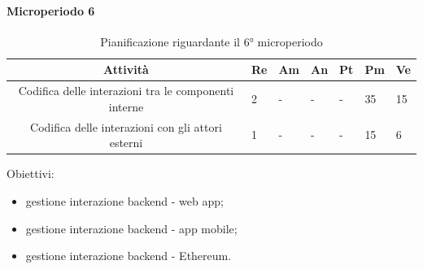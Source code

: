 \paragraph{Microperiodo 6}
\begin{table}[H]
	\centering
	\renewcommand{\arraystretch}{1.5}
	\begin{tabular}{|c|p{10mm}|p{8mm}|p{8mm}|p{8mm}|p{8mm}|p{8mm}|}
		\hline
		\rowcolor{lighter-grayer}
		\textbf{Attività}                         & \textbf{Re} & \textbf{Am} & \textbf{An} & \textbf{Pt} & \textbf{Pm} & \textbf{Ve} \\ \hline
		
		Codifica delle interazioni tra le componenti interne & 2                                &       -                           &        -                          &             -                     & 35                               & 15                               \\ \hline
		Codifica delle interazioni con gli attori esterni    & 1                                &      -                            &         -                         &                -                  & 15                               & 6                                \\ \hline
		
	\end{tabular}
	\caption{ Pianificazione riguardante il 6° microperiodo\\}
\end{table}

Obiettivi:
\begin{itemize}
	\item gestione interazione backend - web app;
	\item gestione interazione backend - app mobile;
	\item gestione interazione backend - Ethereum.
\end{itemize}

